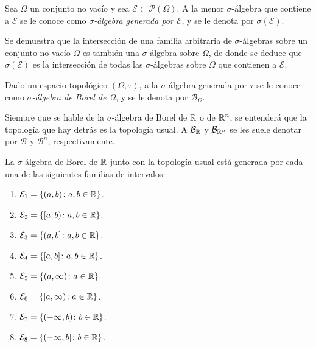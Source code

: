 \documentclass[a4paper, 11pt, extrafontsizes]{memoir}
\begin{document}
\begin{definition}
    Sea $\Omega$ un conjunto no vacío y sea $\mathcal{E} \subset \mathcal{P}(\Omega)$. A la menor $\sigma$-álgebra que contiene a $\mathcal{E}$ se le conoce como \emph{$\sigma$-álgebra generada por $\mathcal{E}$}, y se le denota por $\sigma(\mathcal{E})$.
\end{definition}

Se demuestra que la intersección de una familia arbitraria de $\sigma$-álgebras sobre un conjunto no vacío $\Omega$ es también una $\sigma$-álgebra sobre $\Omega$, de donde se deduce que $\sigma(\mathcal{E})$ es la intersección de todas las $\sigma$-álgebras sobre $\Omega$ que contienen a $\mathcal{E}$.

\begin{definition}
    Dado un espacio topológico $(\Omega, \tau)$, a la $\sigma$-álgebra generada por $\tau$ se le conoce como \emph{$\sigma$-álgebra de Borel de $\Omega$}, y se le denota por $\mathcal{B}_\Omega$.
\end{definition}

Siempre que se hable de la $\sigma$-álgebra de Borel de $\mathbb R$ o de $\mathbb R^n$, se entenderá que la topología que hay detrás es la topología usual. A $\mathcal{B}_\mathbb R$ y $\mathcal{B}_{\mathbb R^n}$ se les suele denotar por $\mathcal{B}$ y $\mathcal{B}^n$, respectivamente.

\begin{proposition}
    La $\sigma$-álgebra de Borel de $\mathbb R$ junto con la topología usual está generada por cada una de las siguientes familias de intervalos:
    \begin{enumerate}
        \item $\mathcal{E}_1 = \{(a,b) \colon a,b\in \mathbb R \}$.
        \item $\mathcal{E}_2 = \{[a,b) \colon a,b\in \mathbb R \}$.
        \item $\mathcal{E}_3 = \{(a,b] \colon a,b\in \mathbb R \}$.
        \item $\mathcal{E}_4 = \{[a,b] \colon a,b\in \mathbb R \}$.
        \item $\mathcal{E}_5 = \{(a,\infty) \colon a\in \mathbb R \}$.
        \item $\mathcal{E}_6 = \{[a,\infty) \colon a\in \mathbb R \}$.
        \item $\mathcal{E}_7 = \{(-\infty,b) \colon b\in \mathbb R \}$.
        \item $\mathcal{E}_8 = \{(-\infty,b] \colon b\in \mathbb R \}$.
    \end{enumerate}
\end{proposition}
\end{document}
